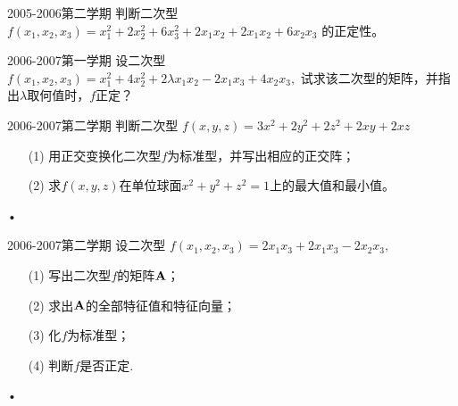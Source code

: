  \begin{frame}
   \begin{footnotesize}
    \begin{exampleblock}{2005-2006第二学期}
      判断二次型
      $
      f(x_1,x_2,x_3)=x_1^2+2x_2^2+6x_3^2+2x_1x_2+2x_1x_2+6x_2x_3
      $
      的正定性。
    \end{exampleblock}

   \begin{exampleblock}{2006-2007第一学期}
      设二次型
      $
      f(x_1,x_2,x_3)=x_1^2+4x_2^2+2\lambda  x_1x_2-2x_1x_3+4x_2x_3,
      $
      试求该二次型的矩阵，并指出$\lambda$取何值时，$f$正定？
    \end{exampleblock}
  \end{footnotesize}
\end{frame}


 \begin{frame}
   \begin{footnotesize}
    \begin{exampleblock}{2006-2007第二学期}
      判断二次型
      $
      f(x,y,z)=3x^2+2y^2+2z^2+2xy+2xz
      $
       \begin{itemize}
\item[(1)] 用正交变换化二次型$f$为标准型，并写出相应的正交阵；
\item[(2)]  求$f(x,y,z)$在单位球面$x^2+y^2+z^2=1$上的最大值和最小值。
\end{itemize}•
    \end{exampleblock}

   \begin{exampleblock}{2006-2007第二学期}
      设二次型
      $
      f(x_1,x_2,x_3)=2x_1x_3+2x_1x_3-2x_2x_3,
      $
\begin{itemize}
\item[(1)] 写出二次型$f$的矩阵$\mathbf{A}$；
\item[(2)]  求出$\mathbf{A}$的全部特征值和特征向量；
\item[(3)] 化$f$为标准型；
\item[(4)] 判断$f$是否正定.
\end{itemize}•
    \end{exampleblock}
  \end{footnotesize}
\end{frame}


